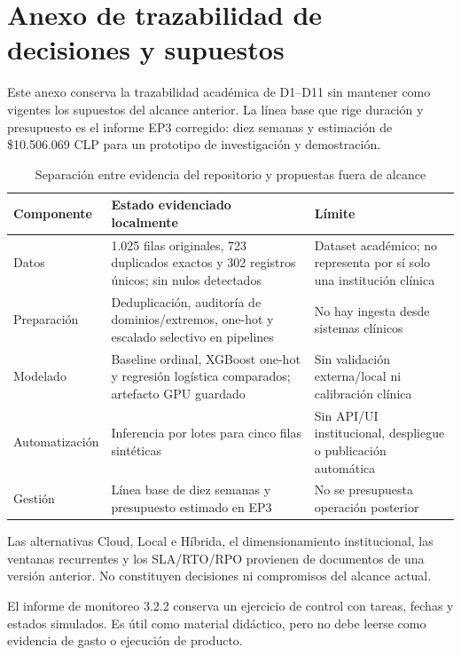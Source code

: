\section{Anexo de trazabilidad de decisiones y supuestos}

Este anexo conserva la trazabilidad académica de D1--D11 sin mantener como vigentes los supuestos del alcance anterior. La línea base que rige duración y presupuesto es el informe EP3 corregido: diez semanas y estimación de \$10.506.069 CLP para un prototipo de investigación y demostración.

\begin{table}[H]
  \centering
  \caption{Separación entre evidencia del repositorio y propuestas fuera de alcance}
  \label{tab:trazabilidad-alcance-actual}
  \small
  \begin{tabularx}{\textwidth}{@{}p{3cm}X X@{}}
    \toprule
    Componente & Estado evidenciado localmente & Límite \\
    \midrule
    Datos & 1.025 filas originales, 723 duplicados exactos y 302 registros únicos; sin nulos detectados & Dataset académico; no representa por sí solo una institución clínica \\
    Preparación & Deduplicación, auditoría de dominios/extremos, one-hot y escalado selectivo en pipelines & No hay ingesta desde sistemas clínicos \\
    Modelado & Baseline ordinal, XGBoost one-hot y regresión logística comparados; artefacto GPU guardado & Sin validación externa/local ni calibración clínica \\
    Automatización & Inferencia por lotes para cinco filas sintéticas & Sin API/UI institucional, despliegue o publicación automática \\
    Gestión & Línea base de diez semanas y presupuesto estimado en EP3 & No se presupuesta operación posterior \\
    \bottomrule
  \end{tabularx}
\end{table}

Las alternativas Cloud, Local e Híbrida, el dimensionamiento institucional, las ventanas recurrentes y los SLA/RTO/RPO provienen de documentos de una versión anterior. No constituyen decisiones ni compromisos del alcance actual.

El informe de monitoreo 3.2.2 conserva un ejercicio de control con tareas, fechas y estados simulados. Es útil como material didáctico, pero no debe leerse como evidencia de gasto o ejecución de producto.
